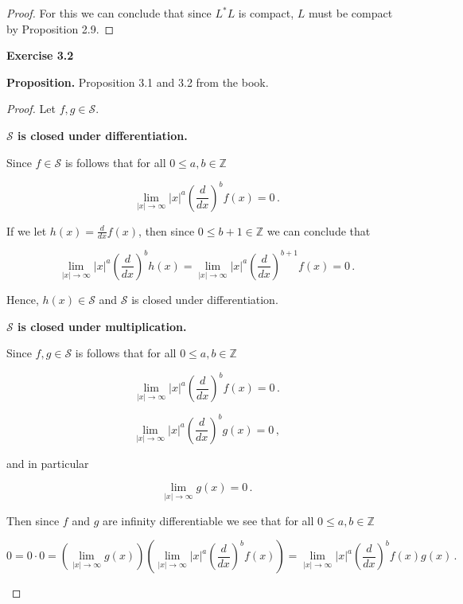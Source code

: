 \documentclass[a4paper]{article}
\numberwithin{equation}{section}
\begin{document}
\begin{description}
\begin{proof}
For this we can conclude that since $L^*L$ is compact, $L$ must be compact by Proposition 2.9.

\end{proof}

\item \textbf{Exercise 3.2}

\item \textbf{Proposition.} Proposition 3.1 and 3.2 from the book.

\item \begin{proof} Let $f,g \in \mathcal{S}.$

	\begin{description}
	
		\item \textbf{$\mathcal{S}$ is closed under differentiation.}
		
		Since $f \in \mathcal{S}$ is follows that for all $0 \leq a,b \in \mathbb{Z}$
		
		$$\lim\limits_{|x|\rightarrow \infty}|x|^a\left( \frac{d}{dx} \right)^bf(x) = 0\,.$$
	
If we let $h(x) = \frac{d}{dx}f(x)$, then since $0 \leq b+1 \in \mathbb{Z}$ we can conclude that

		$$\lim\limits_{|x|\rightarrow \infty}|x|^a\left( \frac{d}{dx} \right)^bh(x) = 		\lim\limits_{|x|\rightarrow \infty}|x|^a\left( \frac{d}{dx} \right)^{b+1}f(x) = 0\,.$$
		
		Hence, $h(x) \in \mathcal{S}$ and $\mathcal{S}$ is closed under differentiation.
	
	\item \textbf{$\mathcal{S}$ is closed under multiplication.}
	
	Since $f,g \in \mathcal{S}$ is follows that for all $0 \leq a,b \in \mathbb{Z}$
		
		$$\lim\limits_{|x|\rightarrow \infty}|x|^a\left( \frac{d}{dx} \right)^bf(x) = 0\,.$$
	
$$\lim\limits_{|x|\rightarrow \infty}|x|^a\left( \frac{d}{dx} \right)^bg(x) = 0\,,$$	

and in particular

$$\lim\limits_{|x|\rightarrow \infty}g(x) = 0\,.$$

Then since $f$ and $g$ are infinity differentiable we see that for all $0 \leq a,b\in \mathbb{Z}$

$$0 = 0 \cdot 0 = \left(\lim\limits_{|x|\rightarrow \infty}g(x)\right)\left(\lim\limits_{|x|\rightarrow \infty}|x|^a\left( \frac{d}{dx} \right)^bf(x)\right) = \lim\limits_{|x|\rightarrow \infty}|x|^a\left( \frac{d}{dx} \right)^bf(x)g(x)\,.$$
	

\end{description}
\end{proof}
\end{description}
\end{document}
